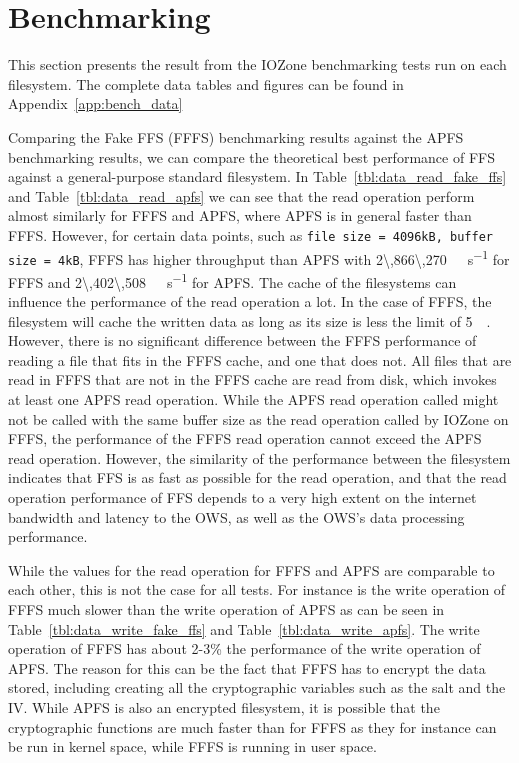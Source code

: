 \section{Benchmarking}
\label{sec:res_bench}
This section presents the result from the IOZone benchmarking tests run on each filesystem. The complete data tables and figures can be found in Appendix~\ref{app:bench_data}


Comparing the Fake FFS (FFFS) benchmarking results against the APFS benchmarking results, we can compare the theoretical best performance of FFS against a general-purpose standard filesystem. In Table~\ref{tbl:data_read_fake_ffs} and Table~\ref{tbl:data_read_apfs} we can see that the read operation perform almost similarly for FFFS and APFS, where APFS is in general faster than FFFS. However, for certain data points, such as \texttt{file size = 4096kB, buffer size = 4kB}, FFFS has higher throughput than APFS with \SI[per-mode = symbol]{2\,866\,270}{\kilo\byte\per\second} for FFFS and \SI[per-mode = symbol]{2\,402\,508}{\kilo\byte\per\second} for APFS. The cache of the filesystems can influence the performance of the read operation a lot. In the case of FFFS, the filesystem will cache the written data as long as its size is less the limit of \SI{5}{\mega\byte}. However, there is no significant difference between the FFFS performance of reading a file that fits in the FFFS cache, and one that does not. All files that are read in FFFS that are not in the FFFS cache are read from disk, which invokes at least one APFS read operation. While the APFS read operation called might not be called with the same buffer size as the read operation called by IOZone on FFFS, the performance of the FFFS read operation cannot exceed the APFS read operation. However, the similarity of the performance between the filesystem indicates that FFS is as fast as possible for the read operation, and that the read operation performance of FFS depends to a very high extent on the internet bandwidth and latency to the OWS, as well as the OWS's data processing performance.

While the values for the read operation for FFFS and APFS are comparable to each other, this is not the case for all tests. For instance is the write operation of FFFS much slower than the write operation of APFS as can be seen in Table~\ref{tbl:data_write_fake_ffs} and Table~\ref{tbl:data_write_apfs}. The write operation of FFFS has about 2-3\% the performance of the write operation of APFS. The reason for this can be the fact that FFFS has to encrypt the data stored, including creating all the cryptographic variables such as the salt and the IV. While APFS is also an encrypted filesystem, it is possible that the cryptographic functions are much faster than for FFFS as they for instance can be run in kernel space, while FFFS is running in user space.